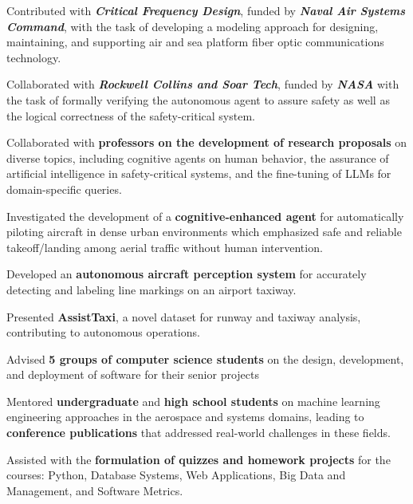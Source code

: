 \begin{cventries}
{\begin{cvitems}
\item Contributed with \textit{\textbf{Critical Frequency Design}}, funded by \textit{\textbf{Naval Air Systems Command}}, with the task of developing a modeling approach for designing, maintaining, and supporting air and sea platform fiber optic communications technology.
\item Collaborated with \textit{\textbf{Rockwell Collins and Soar Tech}}, funded by \textit{\textbf{NASA}} with the task of formally verifying the autonomous agent to assure safety as well as the logical correctness of the safety-critical system.
\item Collaborated with \textbf{professors on the development of research proposals} on diverse topics, including cognitive agents on human behavior, the assurance of artificial intelligence in safety-critical systems, and the fine-tuning of LLMs for domain-specific queries.
\item Investigated the development of a \textbf{cognitive-enhanced agent} for automatically piloting aircraft in dense urban environments which emphasized safe and reliable takeoff/landing among aerial traffic without human intervention.
\item Developed an \textbf{autonomous aircraft perception system} for accurately detecting and labeling line markings on an airport taxiway.
\item Presented \textbf{AssistTaxi}, a novel dataset for runway and taxiway analysis, contributing to autonomous operations.
\item Advised \textbf{5 groups of computer science students} on the design, development, and deployment of software for their senior projects
\item Mentored \textbf{undergraduate} and \textbf{high school students} on machine learning engineering approaches in the aerospace and systems domains, leading to \textbf{conference publications} that addressed real-world challenges in these fields.
\item Assisted with the \textbf{formulation of quizzes and homework projects} for the courses: Python, Database Systems, Web Applications, Big Data and Management, and Software Metrics.

\end{cvitems}}
\end{cventries}
